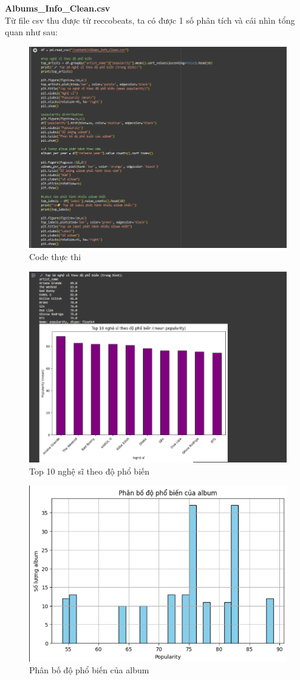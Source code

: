 \textbf{Albums\_Info\_Clean.csv}
\\ Từ file csv thu được từ reccobeats, ta có được 1 số phân tích và cái nhìn tổng quan như sau:
\begin{figure}[H]
    \centering
    \includegraphics[width=0.8\linewidth]{../graphics/data2/6.png}
    \caption{Code thực thi}
    \label{fig:placeholder}
\end{figure}
\begin{figure}[H]
    \centering
    \includegraphics[width=0.7\linewidth]{../graphics/data2/7.png}
    \caption{Top 10 nghệ sĩ theo độ phổ biến}
    \label{fig:placeholder}
\end{figure}

\begin{figure}[H]
    \centering
    \includegraphics[width=0.7\linewidth]{../graphics/data2/8.png}
    \caption{Phân bố độ phổ biến của album}
    \label{fig:placeholder}
\end{figure}

